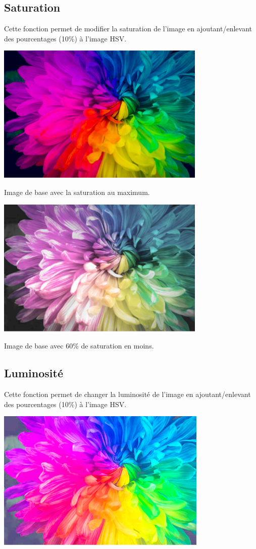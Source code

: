 \documentclass{article}
\begin{document}
\subsection{Saturation}
Cette fonction permet de modifier la saturation de l'image en ajoutant/enlevant des pourcentages (10\%) à l'image HSV.
\bigbreak

\includegraphics[width=10cm]{../SaturationMax}

Image de base avec la saturation au maximum.
\bigbreak

\includegraphics[width=10cm]{../SaturationMoins6}

Image de base avec 60\% de saturation en moins.

\subsection{Luminosité}
Cette fonction permet de changer la luminosité de l'image en ajoutant/enlevant des pourcentages (10\%) à l'image HSV.
\bigbreak

\includegraphics{../LuminositePlus3}
\end{document}
